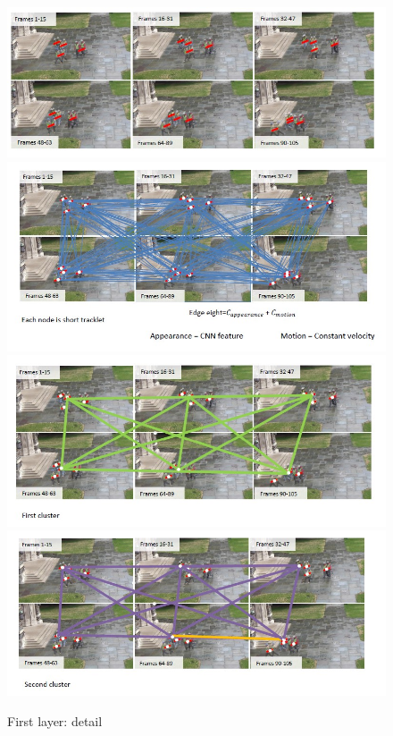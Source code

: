 \begin{enumerate}
    \begin{figure}[h!]
        \centering
        \includegraphics[scale = 1.4]{img/camera10.jpg}
        \includegraphics[scale = 1.4]{img/camera11.jpg}
        \includegraphics[scale = 1.4]{img/camera12.jpg}
        \includegraphics[scale = 1.4]{img/camera13.jpg}
        \label{camera10_13}
        \caption{First layer: detail}
    \end{figure}


\end{enumerate}
